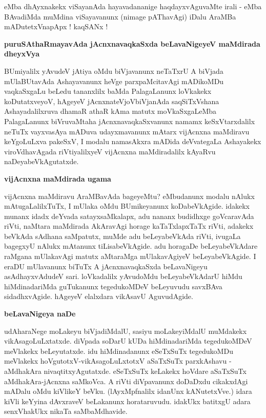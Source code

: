 \noindent
eMba dhAyxnakekx viSayanAda hayavadananige haqdayxvAguvaMte irali - eMba BAvadiMda muMdina viSayavanunx (nimage pAThavAgi) iDalu AraMBa mADutetxVnapApx ! kaqSANx !

{\bigskip
\noindent
{\large\bf puruSAthaRmayavAda jAcnxnavaqkaSxda beLavaNigeyeV maMdirada dheyxVya}}\label{page65}
\medskip

\noindent
BUmiyalilx yAvudeV jAtiya oMdu biVjavanunx neTaTxrU A biVjada mUlaBUtavAda Ashayavanunx heVge parxpaMcitavAgi mADikoMDu vaqkaSxgaLu beLedu tananxlilx baMda PalagaLanunx loVkakekx koDutatxveyoV, hAgeyeV jAcnxnateVjoVbiVjanAda saqSiTxVshana Ashayadalilxruva dhamaR athaR kAma matutx moVkaSxgaLeMba PalagaLanunx biVruvaMtaha jAcnxnavaqkaSxvanunx namamx keSxVtarxdalilx neTuTx vayxvasAya mADuva udayxmavanunx mAtarx vijAcnxna maMdiravu keYgoLuLxva pakeSxV, I modalu namasAkxra \hbox{mADida} deVvategaLa Ashayakekx viroVdhavAgada riVtiyalilxyeV vijAcnxna maMdiradalilx \hbox{kAyaRvu} naDeyabeVkAgutatxde.

{\bigskip
\noindent
{\large\bf vijAcnxna maMdirada ugama}}
\medskip

\noindent
vijAcnxna maMdiravu AraMBavAda bageyeMtu? eMbudanunx modalu nAlukx mAtugaLalilxTuTx, I mUlaka oMdu BUmikeyanunx koDabeVkAgide. idakekx munanx idadx deYvada satayxsaMkalapx, adu nananx budidhxge goVcaravAda riVti, naMtara maMdirada AkAravAgi horage kaTaTxlapxTaTx riVti, adakekx beVkAda sAdhana saMpatutx, muMde adu beLeyabeVkAda riVti, ivugaLa bagegxyU nAlukx mAtanunx tiLisabeVkAgide. adu horagaDe beLeyabeVkAdare raMgana mUlakavAgi matutx aMtaraMga mUlakavAgiyeV beLeyabeVkAgide. I eraDU mUlavanunx biTuTx A jAcnxnavaqkaSxda beLavaNigeyu asAdhayxvAdudeV sari. loVkadalilx yAvudoMdu beLeyabeVkAdarU hiMdu hiMdinadariMda guTukanunx tegedukoMDeV beLeyuvudu savxBAva sidadhxvAgide. hAgeyeV elalxdara vikAsavU AguvudAgide.

{\bigskip
\noindent
{\large\bf beLavaNigeya naDe}}\label{page66}
\medskip

\noindent
udAharaNege moLakeyu biVjadiMdalU, sasiyu moLakeyiMdalU muMdakekx vikAsagoLuLxtatxde. diVpada soDarU kUDa hiMdinadariMda tegedukoMDeV meVlakekx beLeyutatxde. idu hiMdinadanunx eSeTxSuTx tegedukoMDu meVlakekx hoVgutotxV-vikAsagoLuLxtotxV aSaTxSuTx parxkAshavu - aMdhakAra nivaqtitxyAgutatxde. eSeTxSuTx keLakekx hoVdare aSaTxSuTx aMdhakAra-jAcnxna saMkoVca. A riVti diVpavanunx doDaDxdu cikakxdAgi mADalu oMdu kiVlikeY beVku. (lAyxMpfnalilx idanUnx kANutetxVve.) idara kiVli keYyina dAvxraveV beLakanunx horataruvudu. idakUkx batitxgU adara senxVhakUkx nikaTa saMbaMdhavide.

